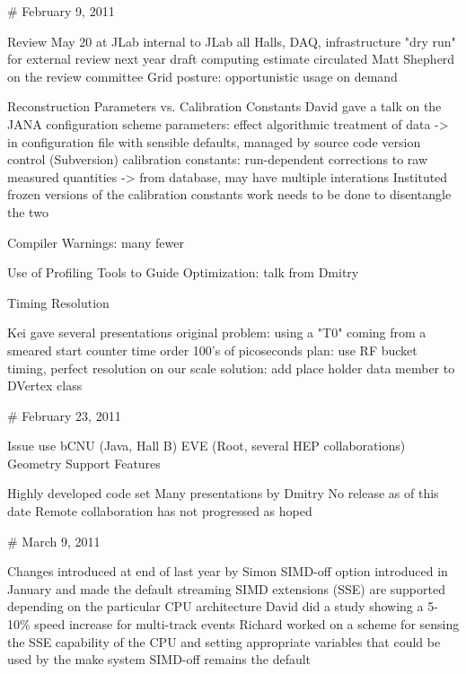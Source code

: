 # February 9, 2011 

\bi
\I Review May 20 at JLab
\I internal to JLab
\I all Halls, DAQ, infrastructure
\I "dry run" for external review next year
\I draft computing estimate circulated
\I Matt Shepherd on the review committee
\I Grid posture: opportunistic usage on demand
\ei


\I Reconstruction Parameters vs. Calibration Constants
\bi
\I David gave a talk on the JANA configuration scheme
\I parameters: effect algorithmic treatment of data -> in configuration file with sensible defaults, managed by source code version control (Subversion)
\I calibration constants: run-dependent corrections to raw measured quantities -> from database, may have multiple interations
\I Instituted frozen versions of the calibration constants
\I work needs to be done to disentangle the two
\ei

\I Compiler Warnings: many fewer

\I Use of Profiling Tools to Guide Optimization: talk from Dmitry

\I Timing Resolution

\bi
\I Kei gave several presentations
\I original problem: using a "T0" coming from a smeared start counter time order 100's of picoseconds
\I plan: use RF bucket timing, perfect resolution on our scale
\I solution: add place holder data member to DVertex class
\ei

# February 23, 2011


\bi
\I Issue use
\bi
\I bCNU (Java, Hall B)
\I EVE (Root, several HEP collaborations)
\ei
\I Geometry
\I Support
\I Features
\ei


\bi
\I Highly developed code set
\I Many presentations by Dmitry
\I No release as of this date
\I Remote collaboration has not progressed as hoped
\ei

# March 9, 2011


\bi
\I Changes introduced at end of last year by Simon
\I SIMD-off option introduced in January and made the default 
\I streaming SIMD extensions (SSE) are supported depending on the particular CPU architecture
\I David did a study showing a 5-10\% speed increase for multi-track events
\I Richard worked on a scheme for sensing the SSE capability of the CPU and setting appropriate variables that could be used by the make system
\I SIMD-off remains the default
\ei

